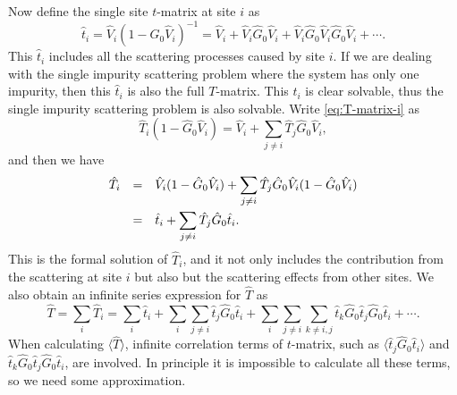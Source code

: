 \documentclass{book}
\newcommand{\average}[1]{\langle#1\rangle}
\numberwithin{equation}{section}
\begin{document}
Now define the single site $t$-matrix at site $i$ as
\begin{equation}
  \hat{t}_i=\hat{V}_i(1-\hat{G}_0\hat{V}_i)^{-1}=
  \hat{V}_i+\hat{V}_i\hat{G}_0\hat{V}_i+\hat{V}_i\hat{G}_0\hat{V}_i\hat{G}_0\hat{V}_i+\cdots.
\end{equation}
This $\hat{t}_i$ includes all the scattering processes caused by site
$i$. If we are dealing with the single impurity scattering problem
where the system has only one impurity, then this $\hat{t}_i$ is also
the full $T$-matrix. This $\hat{t}_i$ is clear solvable, thus the
single impurity scattering problem is also solvable. Write
\eqref{eq:T-matrix-i} as
\begin{equation}
  \hat{T}_i(1-\hat{G}_0\hat{V}_i)=\hat{V}_i+\sum_{j\ne i}\hat{T}_j\hat{G}_0\hat{V}_i,
\end{equation}
and then we have
\begin{equation}
  \label{eq:T-matrix-Tt}
  \begin{array}{rcl}
    \hat{T}_i&=&\displaystyle\hat{V}_i(1-\hat{G}_0\hat{V}_i)
    +\sum_{j\ne i}\hat{T}_j\hat{G}_0\hat{V}_i(1-\hat{G}_0\hat{V}_i)\\\vbox to 14pt{}
    &=&\displaystyle\hat{t}_i+\sum_{j\ne i}\hat{T}_j\hat{G}_0\hat{t}_i.
  \end{array}
\end{equation}
This is the formal solution of $\hat{T}_i$, and it not only includes
the contribution from the scattering at site $i$ but also but the
scattering effects from other sites. We also obtain an infinite series
expression for $\hat{T}$ as
\begin{equation}
  \label{eq:T-matrix-t}
  \hat{T}=\sum_{i}\hat{T}_i=\sum_i\hat{t}_i+\sum_i\sum_{j\ne i}\hat{t}_j\hat{G}_0\hat{t}_i
  +\sum_i\sum_{j\ne i}\sum_{k\ne i,j}\hat{t}_k\hat{G}_0\hat{t}_j\hat{G}_0\hat{t}_i+\cdots.
\end{equation}
When calculating $\average{\hat{T}}$, infinite correlation terms of
$t$-matrix, such as $\average{\hat{t}_j\hat{G}_0\hat{t}_i}$ and
$\hat{t}_k\hat{G}_0\hat{t}_j\hat{G}_0\hat{t}_i$, are involved. In
principle it is impossible to calculate all these terms, so we need
some approximation. 
\end{document}
